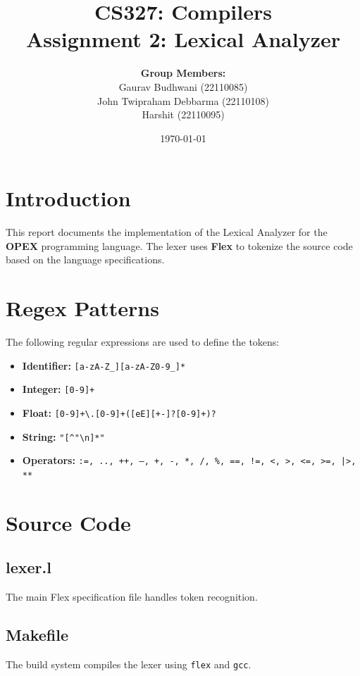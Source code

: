 \documentclass[12pt, a4paper]{article}
\title{\textbf{CS327: Compilers} \\ Assignment 2: Lexical Analyzer}
\author{
    \textbf{Group Members:} \\
    Gaurav Budhwani (22110085) \\
    John Twipraham Debbarma (22110108) \\
    Harshit (22110095)
}
\date{\today}
\begin{document}
\maketitle
\tableofcontents
\newpage

\section{Introduction}
This report documents the implementation of the Lexical Analyzer for the \textbf{OPEX} programming language. The lexer uses \textbf{Flex} to tokenize the source code based on the language specifications.

\section{Regex Patterns}
The following regular expressions are used to define the tokens:

\begin{itemize}
    \item \textbf{Identifier:} \texttt{[a-zA-Z\_][a-zA-Z0-9\_]*}
    \item \textbf{Integer:} \texttt{[0-9]+}
    \item \textbf{Float:} \texttt{[0-9]+\textbackslash.[0-9]+([eE][+-]?[0-9]+)?}
    \item \textbf{String:} \texttt{"[\textasciicircum"\textbackslash n]*"}
    \item \textbf{Operators:} \texttt{:=, .., ++, --, +, -, *, /, \%, ==, !=, <, >, <=, >=, |>, **}
\end{itemize}

\section{Source Code}
\subsection{lexer.l}
The main Flex specification file handles token recognition.



\subsection{Makefile}
The build system compiles the lexer using \texttt{flex} and \texttt{gcc}.


\end{document}
